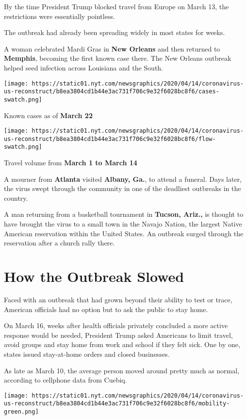 By the time President Trump blocked travel from Europe on March 13, the
restrictions were essentially pointless.

The outbreak had already been spreading widely in most states for weeks.

A woman celebrated Mardi Gras in \textbf{New Orleans} and then returned
to \textbf{Memphis}, becoming the first known case there. The New
Orleans outbreak helped seed infection across Louisiana and the South.

\texttt{[image: https://static01.nyt.com/newsgraphics/2020/04/14/coronavirus-us-reconstruct/b8ea3804cd1b44e3ac731f706c9e32f6028bc8f6/cases-swatch.png]}

Known cases as of \textbf{March 22}

\texttt{[image: https://static01.nyt.com/newsgraphics/2020/04/14/coronavirus-us-reconstruct/b8ea3804cd1b44e3ac731f706c9e32f6028bc8f6/flow-swatch.png]}

Travel volume from \textbf{March 1 to March 14}

A mourner from \textbf{Atlanta} visited \textbf{Albany, Ga.}, to attend
a funeral. Days later, the virus swept through the community in one of
the deadliest outbreaks in the country.

A man returning from a basketball tournament in \textbf{Tucson, Ariz.,}
is thought to have brought the virus to a small town in the Navajo
Nation, the largest Native American reservation within the United
States. An outbreak surged through the reservation after a church rally
there.

\hypertarget{how-the-outbreak-slowed}{%
\section{How the Outbreak Slowed}\label{how-the-outbreak-slowed}}

Faced with an outbreak that had grown beyond their ability to test or
trace, American officials had no option but to ask the public to stay
home.

On March 16, weeks after health officials privately concluded a more
active response would be needed, President Trump asked Americans to
limit travel, avoid groups and stay home from work and school if they
felt sick. One by one, states issued stay-at-home orders and closed
businesses.

As late as March 10, the average person moved around pretty much as
normal, according to cellphone data from Cuebiq.

\texttt{[image: https://static01.nyt.com/newsgraphics/2020/04/14/coronavirus-us-reconstruct/b8ea3804cd1b44e3ac731f706c9e32f6028bc8f6/mobility-green.png]}

